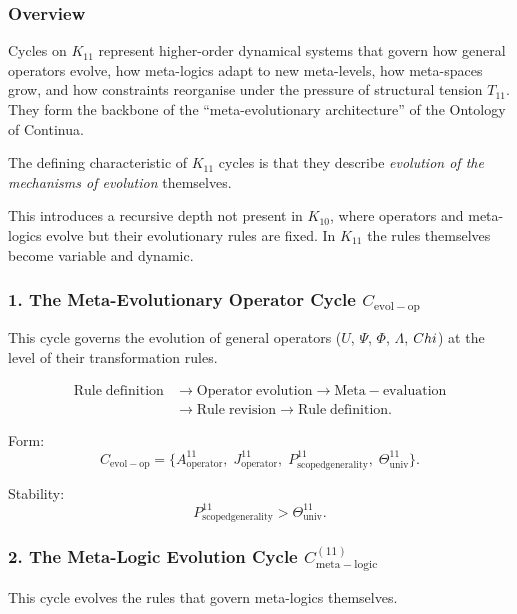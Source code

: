 \subsubsection{Overview}

Cycles on $K_{11}$ represent higher-order dynamical systems that govern
how general operators evolve, how meta-logics adapt to new meta-levels,
how meta-spaces grow, and how constraints reorganise under the pressure of
structural tension $T_{11}$. They form the backbone of the ``meta-evolutionary
architecture'' of the Ontology of Continua.

The defining characteristic of $K_{11}$ cycles is that they describe
\emph{evolution of the mechanisms of evolution} themselves.

This introduces a recursive depth not present in $K_{10}$, where operators
and meta-logics evolve but their evolutionary rules are fixed.  
In $K_{11}$ the rules themselves become variable and dynamic.


\subsubsection{1. The Meta-Evolutionary Operator Cycle $C_{\mathrm{evol-op}}$}

This cycle governs the evolution of general operators ($U$, $\Psi$, $\Phi$,
$\Lambda$, $Chi$) at the level of their transformation rules.

\[
  \begin{aligned}
  \mathrm{Rule\;definition}
  &\to \mathrm{Operator\;evolution}
  \to \mathrm{Meta\!-\!evaluation}\\
  &\to \mathrm{Rule\;revision}
  \to \mathrm{Rule\;definition}.
  \end{aligned}
\]

Form:
\[
  C_{\mathrm{evol-op}}
  =
  \{
    A^{11}_{\mathrm{operator}},\;
    J^{11}_{\mathrm{operator}},\;
    P^{11}_{\mathrm{scoped generality}},\;
    \Theta^{11}_{\mathrm{univ}}
  \}.
\]

Stability:
\[
  P^{11}_{\mathrm{scoped generality}}>\Theta^{11}_{\mathrm{univ}}.
\]


\subsubsection{2. The Meta-Logic Evolution Cycle $C_{\mathrm{meta\!-\!logic}}^{(11)}$}

This cycle evolves the rules that govern meta-logics themselves.

